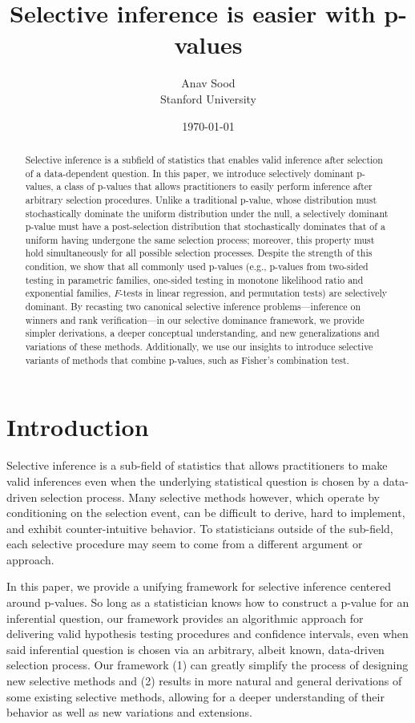 \documentclass{article}
\title{Selective inference is easier with p-values}
\author{Anav Sood\\ Stanford University}
\date{\today}
\begin{document}
\maketitle

\begin{abstract}
Selective inference is a subfield of statistics that enables valid inference after selection of a data-dependent question. In this paper, we introduce selectively dominant p-values, a class of p-values that allows practitioners to easily perform inference after arbitrary selection procedures. Unlike a traditional p-value, whose distribution must stochastically dominate the uniform distribution under the null, a selectively dominant p-value must have a  post-selection distribution that stochastically dominates that of a uniform having undergone the same selection process; moreover, this property must hold simultaneously for all possible selection processes. Despite the strength of this condition, we show that all commonly used p-values (e.g., p-values from two-sided testing in parametric families, one-sided testing in monotone likelihood ratio and exponential families, $F$-tests in linear regression, and permutation tests) are selectively dominant. By recasting two canonical selective inference problems—inference on winners and rank verification—in our selective dominance framework, we provide simpler derivations, a deeper conceptual understanding, and new generalizations and variations of these methods. Additionally, we use our insights to introduce selective variants of methods that combine p-values, such as Fisher's combination test. 
\end{abstract}


\section{Introduction}

Selective inference is a sub-field of statistics that allows practitioners to make valid inferences even when the underlying statistical question is chosen by a data-driven selection process. Many selective methods however, which operate by conditioning on the selection event, can be difficult to derive, hard to implement, and exhibit counter-intuitive behavior. To statisticians outside of the sub-field, each selective procedure may seem to come from a different argument or approach.

In this paper, we provide a unifying framework for selective inference centered around p-values. So long as a statistician knows how to construct a p-value for an inferential question, our framework provides an algorithmic approach for delivering valid hypothesis testing procedures and confidence intervals, even when said inferential question is chosen via an arbitrary, albeit known, data-driven selection process. Our framework (1) can greatly simplify the process of designing new selective methods and (2) results in more natural and general derivations of some existing selective methods, allowing for a deeper understanding of their behavior as well as new variations and extensions. 
\end{document}
